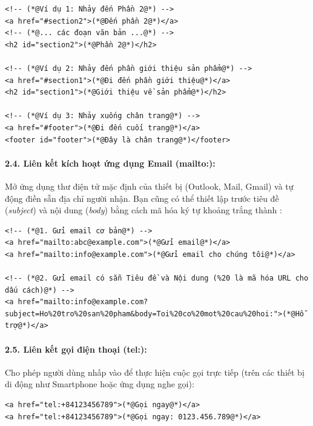 \begin{codeWindow}
\begin{lstlisting}[language=HTML5]
<!-- (*@Ví dụ 1: Nhảy đến Phần 2@*) -->
<a href="#section2">(*@Đến phần 2@*)</a>
<!-- (*@... các đoạn văn bản ...@*) -->
<h2 id="section2">(*@Phần 2@*)</h2>

<!-- (*@Ví dụ 2: Nhảy đến phần giới thiệu sản phẩm@*) -->
<a href="#section1">(*@Đi đến phần giới thiệu@*)</a>
<h2 id="section1">(*@Giới thiệu về sản phẩm@*)</h2>

<!-- (*@Ví dụ 3: Nhảy xuống chân trang@*) -->
<a href="#footer">(*@Đi đến cuối trang@*)</a>
<footer id="footer">(*@Đây là chân trang@*)</footer>
\end{lstlisting}
\end{codeWindow}

\paragraph{2.4. Liên kết kích hoạt ứng dụng Email (mailto:):}
Mở ứng dụng thư điện tử mặc định của thiết bị (Outlook, Mail, Gmail) và tự động điền sẵn địa chỉ người nhận. Bạn cũng có thể thiết lập trước tiêu đề (\textit{subject}) và nội dung (\textit{body}) bằng cách mã hóa ký tự khoảng trắng thành :

\begin{codeWindow}
\begin{lstlisting}[language=HTML5]
<!-- (*@1. Gửi email cơ bản@*) -->
<a href="mailto:abc@example.com">(*@Gửi email@*)</a>
<a href="mailto:info@example.com">(*@Gửi email cho chúng tôi@*)</a>

<!-- (*@2. Gửi email có sẵn Tiêu đề và Nội dung (%20 là mã hóa URL cho dấu cách)@*) -->
<a href="mailto:info@example.com?subject=Ho%20tro%20san%20pham&body=Toi%20co%20mot%20cau%20hoi:">(*@Hỗ trợ@*)</a>
\end{lstlisting}
\end{codeWindow}

\paragraph{2.5. Liên kết gọi điện thoại (tel:):}
Cho phép người dùng nhấp vào để thực hiện cuộc gọi trực tiếp (trên các thiết bị di động như Smartphone hoặc ứng dụng nghe gọi):

\begin{codeWindow}
\begin{lstlisting}[language=HTML5]
<a href="tel:+84123456789">(*@Gọi ngay@*)</a>
<a href="tel:+84123456789">(*@Gọi ngay: 0123.456.789@*)</a>
\end{lstlisting}
\end{codeWindow}

